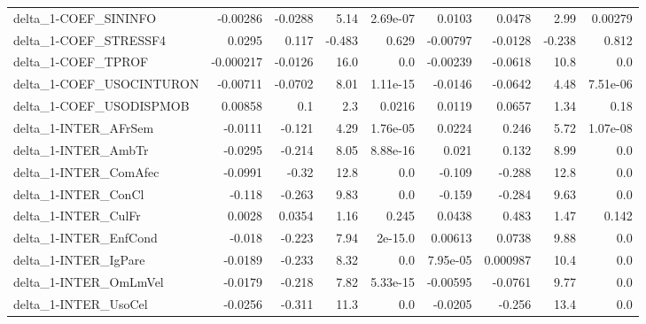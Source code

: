 \begin{tabular}{lrrrrrrrr}
delta\_1-COEF\_SININFO                  &    -0.00286 &      -0.0288 &     5.14 & 2.69e-07 &     0.0103 &      0.0478 &         2.99 &       0.00279 \\
delta\_1-COEF\_STRESSF4                 &      0.0295 &        0.117 &   -0.483 &    0.629 &   -0.00797 &     -0.0128 &       -0.238 &         0.812 \\
delta\_1-COEF\_TPROF                    &   -0.000217 &      -0.0126 &     16.0 &      0.0 &   -0.00239 &     -0.0618 &         10.8 &           0.0 \\
delta\_1-COEF\_USOCINTURON              &    -0.00711 &      -0.0702 &     8.01 & 1.11e-15 &    -0.0146 &     -0.0642 &         4.48 &      7.51e-06 \\
delta\_1-COEF\_USODISPMOB               &     0.00858 &          0.1 &      2.3 &   0.0216 &     0.0119 &      0.0657 &         1.34 &          0.18 \\
delta\_1-INTER\_AFrSem                  &     -0.0111 &       -0.121 &     4.29 & 1.76e-05 &     0.0224 &       0.246 &         5.72 &      1.07e-08 \\
delta\_1-INTER\_AmbTr                   &     -0.0295 &       -0.214 &     8.05 & 8.88e-16 &      0.021 &       0.132 &         8.99 &           0.0 \\
delta\_1-INTER\_ComAfec                 &     -0.0991 &        -0.32 &     12.8 &      0.0 &     -0.109 &      -0.288 &         12.8 &           0.0 \\
delta\_1-INTER\_ConCl                   &      -0.118 &       -0.263 &     9.83 &      0.0 &     -0.159 &      -0.284 &         9.63 &           0.0 \\
delta\_1-INTER\_CulFr                   &      0.0028 &       0.0354 &     1.16 &    0.245 &     0.0438 &       0.483 &         1.47 &         0.142 \\
delta\_1-INTER\_EnfCond                 &      -0.018 &       -0.223 &     7.94 &  2e-15.0 &    0.00613 &      0.0738 &         9.88 &           0.0 \\
delta\_1-INTER\_IgPare                  &     -0.0189 &       -0.233 &     8.32 &      0.0 &   7.95e-05 &    0.000987 &         10.4 &           0.0 \\
delta\_1-INTER\_OmLmVel                 &     -0.0179 &       -0.218 &     7.82 & 5.33e-15 &   -0.00595 &     -0.0761 &         9.77 &           0.0 \\
delta\_1-INTER\_UsoCel                  &     -0.0256 &       -0.311 &     11.3 &      0.0 &    -0.0205 &      -0.256 &         13.4 &           0.0 \\

\end{tabular}
